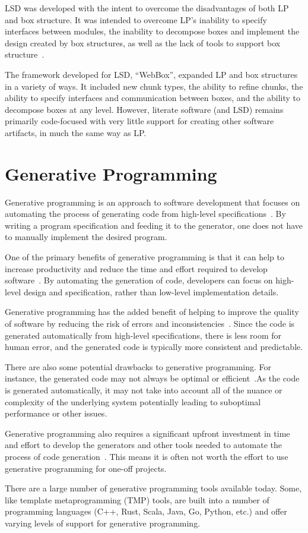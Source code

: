 LSD was developed with the intent to overcome the disadvantages of both LP and
box structure. It was intended to overcome LP's inability to specify interfaces
between modules, the inability to decompose boxes and implement the design
created by box structures, as well as the lack of tools to support box
structure~\cite{Deck1996}.

The framework developed for LSD, ``WebBox'', expanded LP and box structures in a
variety of ways. It included new chunk types, the ability to refine chunks, the
ability to specify interfaces and communication between boxes, and the ability
to decompose boxes at any level. However, literate software (and LSD) remains
primarily code-focused with very little support for creating other software
artifacts, in much the same way as LP.

\section{Generative Programming}

Generative programming is an approach to software development that focuses on 
automating the process of generating code from high-level 
specifications~\cite{Czarnecki2000,Taha2006}. By writing a program 
specification and feeding it to the generator, one does not have to manually 
implement the desired program.

One of the primary benefits of generative programming is that it can help to 
increase productivity and reduce the time and effort required to develop 
software~\cite{Czarnecki2000}. By automating the generation of code, developers 
can focus on high-level design and specification, rather than low-level 
implementation details.

Generative programming has the added benefit of helping to improve the quality 
of software by reducing the risk of errors and 
inconsistencies~\cite{Czarnecki2000,Taha2006}. Since the code is generated 
automatically from high-level specifications, there is less room for human 
error, and the generated code is typically more consistent and predictable.

There are also some potential drawbacks to generative programming. For 
instance, the generated code may not always be optimal or 
efficient~\cite{Czarnecki2000,Taha2006}.As the code is generated 
automatically, it may not take into account all of the nuance or complexity
of the underlying system potentially leading to suboptimal performance or other 
issues.

Generative programming also requires a significant upfront investment in time 
and effort to develop the generators and other tools needed to automate the 
process of code generation~\cite{Czarnecki2000,Taha2006}. This means it is 
often not worth the effort to use generative programming for one-off projects.

There are a large number of generative programming tools available today. Some, 
like template metaprogramming (TMP) tools, are built into a number of 
programming languages (C++, Rust, Scala, Java, Go, Python, etc.) and offer 
varying levels of support for generative programming. 
